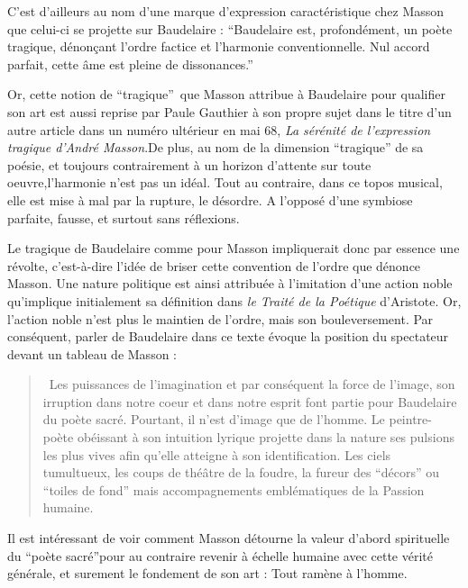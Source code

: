 	C’est d’ailleurs au nom d’une marque d’expression caractéristique chez Masson que celui-ci se projette sur Baudelaire : \enquote{Baudelaire est, profondément, un poète tragique, dénonçant l’ordre factice et l’harmonie conventionnelle. Nul accord parfait, cette âme est pleine de dissonances.}

	Or, cette notion de \enquote{tragique} que Masson attribue à Baudelaire pour qualifier son art est aussi reprise par Paule Gauthier à son propre sujet dans le titre d’un autre article dans un numéro ultérieur en mai 68, \emph{La sérénité de l’expression tragique d’André Masson}.De plus, au nom de la dimension \enquote{tragique} de sa poésie, et toujours contrairement à un horizon d’attente sur toute oeuvre,l’harmonie n’est pas un idéal. Tout au contraire, dans ce topos musical, elle est mise à mal par la rupture, le désordre. A l’opposé d’une symbiose parfaite, fausse, et surtout sans réflexions.

	
 Le tragique de Baudelaire comme pour Masson impliquerait donc par essence une révolte, c’est-à-dire l’idée de briser cette convention de l’ordre que dénonce Masson. Une nature politique est ainsi attribuée à l’imitation d’une action noble qu’implique initialement sa définition dans \emph{le Traité de la Poétique} d’Aristote. Or, l’action noble n’est plus le maintien de l’ordre, mais son bouleversement. Par conséquent, parler de Baudelaire dans ce texte évoque la position du spectateur devant un tableau de Masson : 

\begin{quote}
 Les puissances de l’imagination et par conséquent la force de l’image, son irruption dans notre coeur et dans notre esprit font partie pour Baudelaire du poète sacré. Pourtant, il n’est d’image que de l’homme. Le peintre-poète obéissant à son intuition lyrique projette dans la nature ses pulsions les plus vives afin qu’elle atteigne à son identification. Les ciels tumultueux, les coups de théâtre de la foudre, la fureur des \enquote{décors} ou \enquote{toiles de fond} mais accompagnements emblématiques de la Passion humaine.	
\end{quote}
 
 Il est intéressant de voir comment Masson détourne la valeur d’abord spirituelle du \enquote{poète sacré}pour au contraire revenir à échelle humaine avec cette vérité générale, et surement le fondement de son art : Tout ramène à l’homme. 

